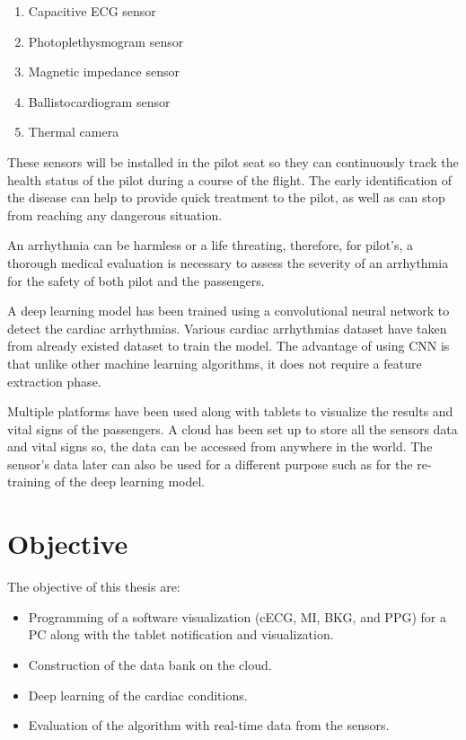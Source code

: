 \begin{enumerate}
	\item Capacitive ECG sensor
	\item Photoplethysmogram sensor
	\item Magnetic impedance sensor
	\item Ballistocardiogram sensor
	\item Thermal camera
\end{enumerate}

These sensors will be installed in the pilot seat so they can continuously track the health status of the pilot during a course of the flight. The early identification of the disease can help to provide quick treatment to the pilot, as well as can stop from reaching any dangerous situation.

An arrhythmia can be harmless or a life threating, therefore, for pilot's, a thorough medical evaluation is necessary to assess the severity of an arrhythmia for the safety of both pilot and the passengers.


A deep learning model has been trained using a convolutional neural network to detect the cardiac arrhythmias. Various cardiac arrhythmias dataset have taken from already existed dataset to train the model. The advantage of using CNN is that unlike other machine learning algorithms, it does not require a feature extraction phase.

Multiple platforms have been used along with tablets to visualize the results and vital signs of the passengers. A cloud has been set up to store all the sensors data and vital signs so, the data can be accessed from anywhere in the world.
The sensor's data later can also be used for a different purpose such as for the re-training of the deep learning model.



\section{Objective}
The objective of this thesis are:

\begin{itemize}
	\item Programming of a software visualization (cECG, MI, BKG, and PPG) for a PC along with the tablet notification and visualization.
	\item Construction of the data bank on the cloud.
	\item Deep learning of the cardiac conditions.
	\item Evaluation of the algorithm with real-time data from the sensors.
\end{itemize}
